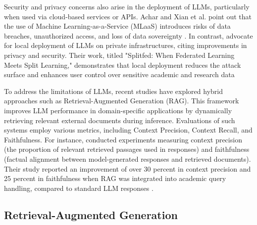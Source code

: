 \begin{refsection}
\hspace{0.4cm}Security and privacy concerns also arise in the deployment of LLMs, particularly when used via cloud-based services or APIs. Achar and Xian et al. point out that the use of Machine Learning-as-a-Service (MLaaS) introduces risks of data breaches, unauthorized access, and loss of data sovereignty \cite{omar2024applications} \cite{lucas2024systematic}. In contrast, \citeauthor{thapa2022splitfed} \citeyear{thapa2022splitfed} advocate for local deployment of LLMs on private infrastructures, citing improvements in privacy and security. Their work, titled "Splitfed: When Federated Learning Meets Split Learning," demonstrates that local deployment reduces the attack surface and enhances user control over sensitive academic and research data \cite{achar2018data}

\hspace{0.4cm}To address the limitations of LLMs, recent studies have explored hybrid approaches such as Retrieval-Augmented Generation (RAG). This framework improves LLM performance in domain-specific applications by dynamically retrieving relevant external documents during inference. Evaluations of such systems employ various metrics, including Context Precision, Context Recall, and Faithfulness. For instance, \citeauthor{yalamanchili2024quality} \citeyear{yalamanchili2024quality} conducted experiments measuring context precision (the proportion of relevant retrieved passages used in responses) and faithfulness (factual alignment between model-generated responses and retrieved documents). Their study reported an improvement of over 30 percent in context precision and 25 percent in faithfulness when RAG was integrated into academic query handling, compared to standard LLM responses \cite{yalamanchili2024quality}.


\subsection{Retrieval-Augmented Generation}


\end{refsection}
